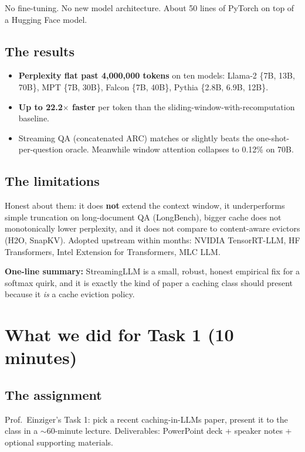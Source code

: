 \documentclass[11pt,a4paper]{article}
\begin{document}
No fine-tuning. No new model architecture. About 50 lines of PyTorch on
top of a Hugging Face model.

\subsection{The results}
\begin{itemize}[leftmargin=1.5em,itemsep=0.1em]
  \item \textbf{Perplexity flat past 4{,}000{,}000 tokens} on ten models:
        Llama-2 \{7B, 13B, 70B\}, MPT \{7B, 30B\}, Falcon \{7B, 40B\},
        Pythia \{2.8B, 6.9B, 12B\}.
  \item \textbf{Up to 22.2$\times$ faster} per token than the
        sliding-window-with-recomputation baseline.
  \item Streaming QA (concatenated ARC) matches or slightly beats the
        one-shot-per-question oracle. Meanwhile window attention
        collapses to 0.12\% on 70B.
\end{itemize}

\subsection{The limitations}
Honest about them: it does \textbf{not} extend the context window, it
underperforms simple truncation on long-document QA (LongBench), bigger
cache does not monotonically lower perplexity, and it does not compare to
content-aware evictors (H2O, SnapKV). Adopted upstream within months:
NVIDIA TensorRT-LLM, HF Transformers, Intel Extension for Transformers,
MLC LLM.

\textbf{One-line summary:} StreamingLLM is a small, robust, honest
empirical fix for a softmax quirk, and it is exactly the kind of paper a
caching class should present because it \emph{is} a cache eviction policy.

\section{What we did for Task 1 (10 minutes)}

\subsection{The assignment}
Prof.\ Einziger's Task 1: pick a recent caching-in-LLMs paper, present it
to the class in a $\sim$60-minute lecture. Deliverables: PowerPoint deck +
speaker notes + optional supporting materials.
\end{document}
